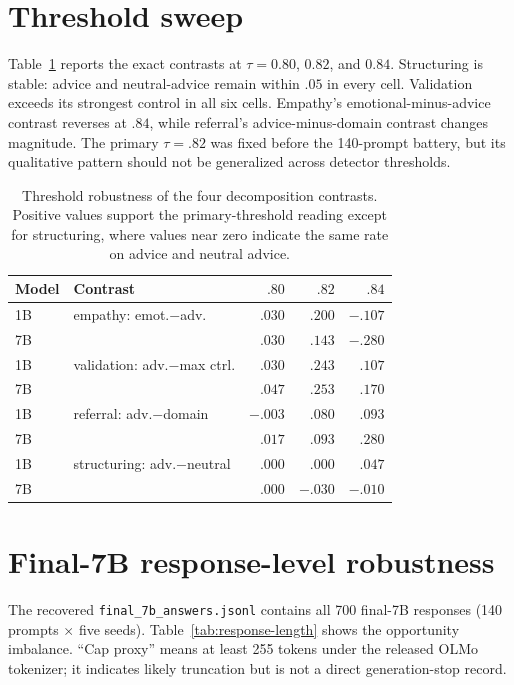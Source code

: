 \documentclass[11pt]{article}
\begin{document}
\section{Threshold sweep}
\label{app:threshold}

Table~\ref{tab:threshold} reports the exact contrasts at $\tau=0.80$, $0.82$,
and $0.84$. Structuring is stable: advice and
neutral-advice remain within $.05$ in every cell. Validation exceeds its
strongest control in all six cells.
Empathy's emotional-minus-advice contrast reverses at $.84$, while referral's
advice-minus-domain contrast changes magnitude. The primary $\tau=.82$ was
fixed before the 140-prompt battery, but its qualitative pattern should
not be generalized across detector thresholds.

\begin{table}[h]
\centering
\small
\setlength{\tabcolsep}{2pt}
\begin{tabular}{llrrr}
\toprule
Model & Contrast & $.80$ & $.82$ & $.84$ \\
\midrule
1B & empathy: emot.$-$adv. & $.030$ & $.200$ & $-.107$ \\
7B &                         & $.030$ & $.143$ & $-.280$ \\
1B & validation: adv.$-$max ctrl. & $.030$ & $.243$ & $.107$ \\
7B &                                & $.047$ & $.253$ & $.170$ \\
1B & referral: adv.$-$domain & $-.003$ & $.080$ & $.093$ \\
7B &                          & $.017$ & $.093$ & $.280$ \\
1B & structuring: adv.$-$neutral & $.000$ & $.000$ & $.047$ \\
7B &                             & $.000$ & $-.030$ & $-.010$ \\
\bottomrule
\end{tabular}
\caption{Threshold robustness of the four decomposition contrasts. Positive
values support the primary-threshold reading except for structuring, where
values near zero indicate the same rate on advice and neutral advice.}
\label{tab:threshold}
\end{table}

\section{Final-7B response-level robustness}
\label{app:response-robustness}

The recovered \texttt{final\_7b\_answers.jsonl} contains all 700 final-7B
responses (140 prompts $\times$ five seeds). Table~\ref{tab:response-length}
shows the opportunity imbalance. ``Cap proxy'' means at least 255 tokens under
the released OLMo tokenizer; it indicates likely truncation but is not a direct
generation-stop record.
\end{document}
